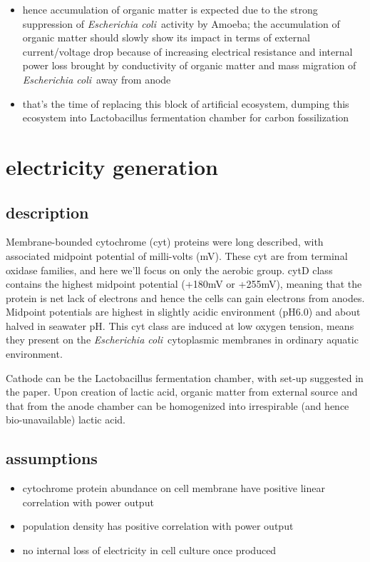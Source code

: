 \documentclass[a4paper,11pt]{article}
\newcommand{\ec}{\textit{Escherichia coli}}
\newcommand{\am}{Amoeba}
\begin{document}
\begin{enumerate}
\begin{itemize}
            \item hence accumulation of organic matter is expected due to the strong suppression of \ec\ activity by \am; the accumulation of organic matter should slowly show its impact in terms of external current/voltage drop because of increasing electrical resistance and internal power loss brought by conductivity of organic matter and mass migration of \ec\ away from anode
            \item that's the time of replacing this block of artificial ecosystem, dumping this ecosystem into Lactobacillus fermentation chamber for carbon fossilization
        \end{itemize}
    \end{enumerate}
    
    \section{electricity generation}
    \subsection{description}
        Membrane-bounded cytochrome (cyt) proteins were long described\autocite{gennis1987cytochromes,edwards2000escherichia}, with associated midpoint potential of milli-volts (mV).  These cyt are from terminal oxidase families, and here we'll focus on only the aerobic group.  cytD class contains the highest midpoint potential (+180mV\autocite{gennis1987cytochromes} or +255mV\autocite{lorence1984effects}), meaning that the protein is net lack of electrons and hence the cells can gain electrons from anodes.  Midpoint potentials are highest in slightly acidic environment (pH6.0) and about halved in seawater pH\autocite{lorence1984effects}.  This cyt class are induced at low oxygen tension\autocite{gennis1987cytochromes}, means they present on the \ec\ cytoplasmic membranes in ordinary aquatic environment.
        
        Cathode can be the Lactobacillus fermentation chamber\autocite{min2005electricity}, with set-up suggested in the paper.  Upon creation of lactic acid, organic matter from external source and that from the anode chamber can be homogenized into irrespirable (and hence bio-unavailable) lactic acid.
    \subsection{assumptions}
    \begin{itemize}
        \item cytochrome protein abundance on cell membrane have positive linear correlation with power output
        \item population density has positive correlation with power output
        \item no internal loss of electricity in cell culture once produced
    \end{itemize}
    
\end{document}
